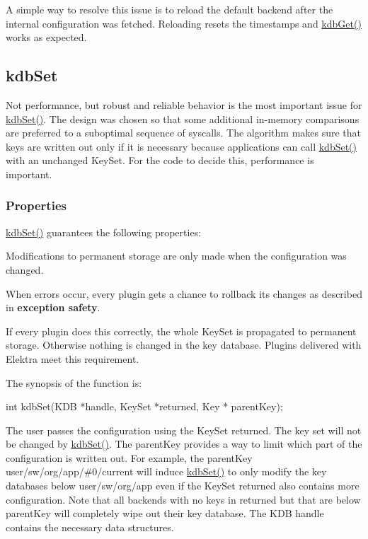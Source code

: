 A simple way to resolve this issue is to reload the default backend after the internal configuration was fetched. Reloading resets the timestamps and {\ttfamily \hyperlink{group__kdb_ga28e385fd9cb7ccfe0b2f1ed2f62453a1}{kdb\+Get()}} works as expected.

\subsection*{kdb\+Set}

Not performance, but robust and reliable behavior is the most important issue for {\ttfamily \hyperlink{group__kdb_ga11436b058408f83d303ca5e996832bcf}{kdb\+Set()}}. The design was chosen so that some additional in-\/memory comparisons are preferred to a suboptimal sequence of {\ttfamily syscalls}. The algorithm makes sure that keys are written out only if it is necessary because applications can call {\ttfamily \hyperlink{group__kdb_ga11436b058408f83d303ca5e996832bcf}{kdb\+Set()}} with an unchanged {\ttfamily Key\+Set}. For the code to decide this, performance is important.

\subsubsection*{Properties}

{\ttfamily \hyperlink{group__kdb_ga11436b058408f83d303ca5e996832bcf}{kdb\+Set()}} guarantees the following properties\+:


\begin{DoxyItemize}
\item Modifications to permanent storage are only made when the configuration was changed.
\item When errors occur, every plugin gets a chance to rollback its changes as described in {\bfseries exception safety}.
\item If every plugin does this correctly, the whole {\ttfamily Key\+Set} is propagated to permanent storage. Otherwise nothing is changed in the key database. Plugins delivered with Elektra meet this requirement.
\end{DoxyItemize}

The synopsis of the function is\+: \begin{DoxyVerb}    int kdbSet(KDB *handle, KeySet *returned, Key * parentKey);
\end{DoxyVerb}


The user passes the configuration using the {\ttfamily Key\+Set} {\ttfamily returned}. The key set will not be changed by {\ttfamily \hyperlink{group__kdb_ga11436b058408f83d303ca5e996832bcf}{kdb\+Set()}}. The {\ttfamily parent\+Key} provides a way to limit which part of the configuration is written out. For example, the {\ttfamily parent\+Key} {\ttfamily user/sw/org/app/\#0/current} will induce {\ttfamily \hyperlink{group__kdb_ga11436b058408f83d303ca5e996832bcf}{kdb\+Set()}} to only modify the key databases below {\ttfamily user/sw/org/app} even if the {\ttfamily Key\+Set} {\ttfamily returned} also contains more configuration. Note that all backends with no keys in {\ttfamily returned} but that are below {\ttfamily parent\+Key} will completely wipe out their key database. The {\ttfamily K\+DB} handle contains the necessary data structures.

